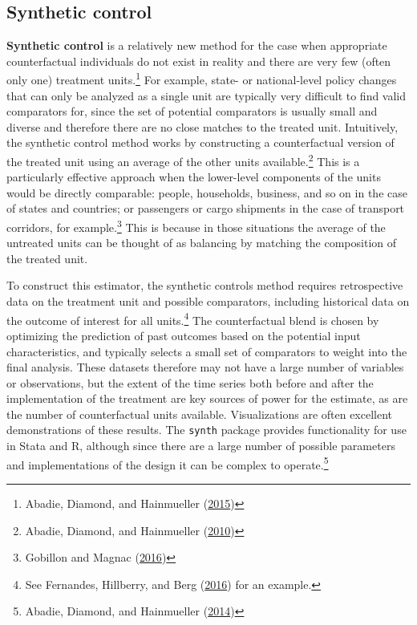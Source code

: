 \documentclass[
]{book}
\begin{document}
\hypertarget{synthetic-control}{%
\subsection*{Synthetic control}\label{synthetic-control}}

\textbf{Synthetic control} is a relatively new method
for the case when appropriate counterfactual individuals
do not exist in reality and there are very few (often only one) treatment units.\footnote{Abadie, Diamond, and Hainmueller (\protect\hyperlink{ref-abadie2015comparative}{2015})}
For example, state- or national-level policy changes
that can only be analyzed as a single unit
are typically very difficult to find valid comparators for,
since the set of potential comparators is usually small and diverse
and therefore there are no close matches to the treated unit.
Intuitively, the synthetic control method works
by constructing a counterfactual version of the treated unit
using an average of the other units available.\footnote{Abadie, Diamond, and Hainmueller (\protect\hyperlink{ref-abadie2010synthetic}{2010})}
This is a particularly effective approach
when the lower-level components of the units would be directly comparable:
people, households, business, and so on in the case of states and countries;
or passengers or cargo shipments in the case of transport corridors, for example.\footnote{Gobillon and Magnac (\protect\hyperlink{ref-gobillon2016regional}{2016})}
This is because in those situations the average of the untreated units
can be thought of as balancing by matching the composition of the treated unit.

To construct this estimator, the synthetic controls method requires
retrospective data on the treatment unit and possible comparators,
including historical data on the outcome of interest for all units.\footnote{See Fernandes, Hillberry, and Berg (\protect\hyperlink{ref-fernandes2016expediting}{2016}) for an example.}
The counterfactual blend is chosen by optimizing the prediction of past outcomes
based on the potential input characteristics,
and typically selects a small set of comparators to weight into the final analysis.
These datasets therefore may not have a large number of variables or observations,
but the extent of the time series both before and after the implementation
of the treatment are key sources of power for the estimate,
as are the number of counterfactual units available.
Visualizations are often excellent demonstrations of these results.
The \texttt{synth} package provides functionality for use in Stata and R,
although since there are a large number of possible parameters
and implementations of the design it can be complex to operate.\footnote{Abadie, Diamond, and Hainmueller (\protect\hyperlink{ref-abadie2014synth}{2014})}
\end{document}
